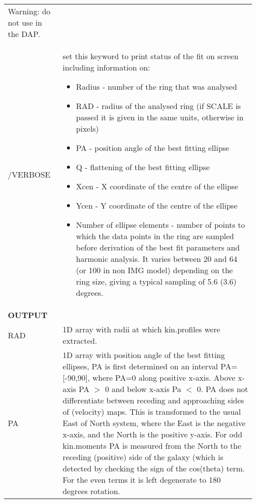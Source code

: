 \begin{center}
\begin{longtable}{p{2.7cm}| p{11.1cm}}
                         \smallskip

                        Warning: do not use in the DAP.\\
%
/VERBOSE & set this keyword to print status of the fit on screen
            including information on:
\begin{itemize}
               \item Radius - number of the ring that was analysed
               \item RAD    - radius of the analysed ring (if SCALE is passed 
                          it is given in the same units, otherwise in pixels)
               \item PA     - position angle of the best fitting ellipse
               \item Q      - flattening of the best fitting ellipse
               \item Xcen   - X coordinate of the centre of the ellipse
               \item Ycen   - Y coordinate of the centre of the ellipse
               \item Number of ellipse elements - number of points to which the data
                          points in the ring are sampled before derivation of
                          the best fit parameters and harmonic analysis. It 
                          varies between 20 and 64 (or 100 in non IMG model)
                          depending on the ring size, giving a typical sampling 
                          of 5.6 (3.6) degrees.
\end{itemize}\\
\hline
{\bf OUTPUT}  & \\
\hline
   RAD & 1D array with radii at which kin.profiles were extracted.\\
%
   PA  & 1D array with position angle of the best fitting ellipses,
            PA is first determined on an interval PA=[-90,90], where
            PA=0 along positive x-axis. Above x-axis PA $>$ 0 and below
            x-axis Pa $<$ 0. PA does not differentiate between receding
            and approaching sides of (velocity) maps. This is
            transformed to the usual East of North system, where the 
	           East is the negative x-axis, and the North is the positive 
	           y-axis. For odd kin.moments PA is measured from the North 
	           to the receding (positive) side of the galaxy (which is 
	           detected by checking the sign of the cos(theta) term. For
	           the even terms it is left degenerate to 180 degrees rotation.\\

\end{longtable}
\end{center}
